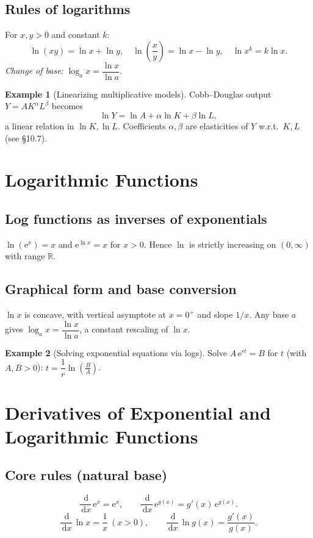 \documentclass[12pt]{article}
\newcommand{\R}{\mathbb{R}}
\newcommand{\dd}{\,\mathrm{d}}
\newcommand{\e}{\mathrm{e}}
\newcommand{\1}{\mathbf{1}}
\theoremstyle{definition}
\newtheorem{example}{Example}
\theoremstyle{plain}
\begin{document}
\subsection*{Rules of logarithms}
For \(x,y>0\) and constant \(k\):
\[
\ln(xy)=\ln x+\ln y,\quad
\ln\!\left(\frac{x}{y}\right)=\ln x-\ln y,\quad
\ln x^k=k\ln x.
\]
\emph{Change of base:} \(\log_a x=\dfrac{\ln x}{\ln a}\).

\begin{example}[Linearizing multiplicative models]
Cobb--Douglas output \(Y=A K^\alpha L^\beta\) becomes
\[
\ln Y=\ln A+\alpha\ln K+\beta\ln L,
\]
a linear relation in \(\ln K,\ln L\). Coefficients \(\alpha,\beta\) are elasticities of \(Y\) w.r.t.\ \(K,L\) (see \S10.7).
\end{example}

\section{Logarithmic Functions}
\subsection*{Log functions as inverses of exponentials}
\(\ln(\e^{x})=x\) and \(\e^{\ln x}=x\) for \(x>0\). Hence \(\ln\) is strictly increasing on \((0,\infty)\) with range \(\R\).

\subsection*{Graphical form and base conversion}
\(\ln x\) is concave, with vertical asymptote at \(x=0^+\) and slope \(1/x\). Any base \(a\) gives \(\log_a x=\dfrac{\ln x}{\ln a}\), a constant rescaling of \(\ln x\).

\begin{example}[Solving exponential equations via logs]
Solve \(A\,\e^{rt}=B\) for \(t\) (with \(A,B>0\)): \(t=\dfrac{1}{r}\ln\!\left(\frac{B}{A}\right)\).
\end{example}

\section{Derivatives of Exponential and Logarithmic Functions}
\subsection*{Core rules (natural base)}
\[
\frac{\dd}{\dd x}\,\e^{x}=\e^{x},\qquad
\frac{\dd}{\dd x}\,\e^{g(x)}=g'(x)\,\e^{g(x)}.
\]
\[
\frac{\dd}{\dd x}\,\ln x=\frac{1}{x}\ (x>0),\qquad
\frac{\dd}{\dd x}\,\ln g(x)=\frac{g'(x)}{g(x)}.
\]
\end{document}
